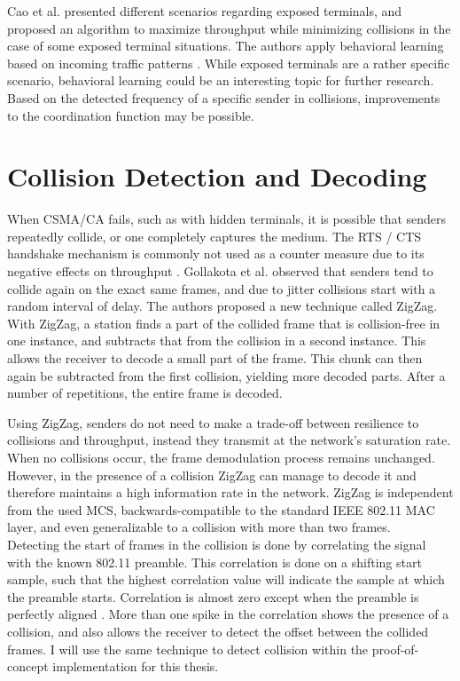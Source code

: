 Cao et al. presented different scenarios regarding exposed terminals, and proposed an algorithm to maximize throughput while minimizing collisions in the case of some exposed terminal situations. The authors apply behavioral learning based on incoming traffic patterns \cite{cao2009}. While exposed terminals are a rather specific scenario, behavioral learning could be an interesting topic for further research. Based on the detected frequency of a specific sender in collisions, improvements to the coordination function may be possible.



\section{Collision Detection and Decoding}

When \gls{CSMA/CA} fails, such as with hidden terminals, it is possible that senders repeatedly collide, or one completely captures the medium. The \gls{RTS} / \gls{CTS} handshake mechanism is commonly not used as a counter measure due to its negative effects on throughput \cite{bianchi2000, gollakota2008, choi2013}. Gollakota et al. observed that senders tend to collide again on the exact same frames, and due to jitter collisions start with a random interval of delay. The authors proposed a new technique called ZigZag. With ZigZag, a station finds a part of the collided frame that is collision-free in one instance, and subtracts that from the collision in a second instance. This allows the receiver to decode a small part of the frame. This chunk can then again be subtracted from the first collision, yielding more decoded parts. After a number of repetitions, the entire frame is decoded.

Using ZigZag, senders do not need to make a trade-off between resilience to collisions and throughput, instead they transmit at the network's saturation rate. When no collisions occur, the frame demodulation process remains unchanged. However, in the presence of a collision ZigZag can manage to decode it and therefore maintains a high information rate in the network. ZigZag is independent from the used \gls{MCS}, backwards-compatible to the standard IEEE 802.11 \gls{MAC} layer, and even generalizable to a collision with more than two frames.\\

Detecting the start of frames in the collision is done by correlating the signal with the known 802.11 preamble. This correlation is done on a shifting start sample, such that the highest correlation value will indicate the sample at which the preamble starts. Correlation is almost zero except when the preamble is perfectly aligned \cite{ieee2012}. More than one spike in the correlation shows the presence of a collision, and also allows the receiver to detect the offset between the collided frames. I will use the same technique to detect collision within the proof-of-concept implementation for this thesis.\\

